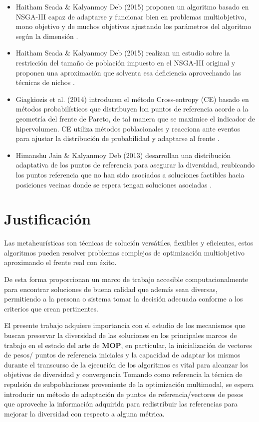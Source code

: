 \documentclass[letterpaper,10pt]{article}
\begin{document}
\begin{itemize}
 \item Haitham Seada \& Kalyanmoy Deb (2015) proponen un algoritmo basado en NSGA-III capaz de adaptarse y funcionar bien en problemas multiobjetivo, mono objetivo y de muchos objetivos ajustando los parámetros del algoritmo según la dimensión \cite{a0ecee762d9f4867a9ded8de598c732e}.
 \item Haitham Seada \& Kalyanmoy Deb (2015) realizan un estudio sobre la restricción del tamaño de población impuesto en el NSGA-III original y proponen una aproximación que solventa esa deficiencia aprovechando las técnicas de nichos \cite{7257251}.
 \item Giagkiozis et al. (2014) introducen el método Cross-entropy (CE) basado en métodos probabilísticos que distribuyen lon puntos de referencia acorde a la geometría del frente de Pareto, de tal manera que se maximice el indicador de hipervolumen. CE utiliza métodos poblacionales y reacciona ante eventos para ajustar la distribución de probabilidad y adaptarse al frente \cite{Giagkiozis2014363}.
 \item Himanshu Jain \& Kalyanmoy Deb (2013) desarrollan una distribución adaptativa de los puntos de referencia para asegurar la diversidad, reubicando los puntos referencia que no han sido asociados a soluciones factibles hacia posiciones vecinas donde se espera tengan soluciones asociadas \cite{jain2013improved}.
\end{itemize}

\section{Justificación}

Las metaheurísticas son técnicas de solución versátiles, flexibles y eficientes, estos algoritmos pueden resolver problemas complejos de optimización multiobjetivo \cite{coello1999comprehensive} aproximando el frente real con éxito.
\newline

De esta forma proporcionan un marco de trabajo accesible computacionalmente para encontrar soluciones de buena calidad que además sean diversas, permitiendo a la persona o sistema tomar la decisión adecuada conforme a los criterios que crean pertinentes.
\newline

El presente trabajo adquiere importancia con el estudio de los mecanismos que buscan preservar la diversidad de las soluciones en los principales marcos de trabajo en el estado del arte de \textbf{MOP}, en particular,
la inicialización de vectores de pesos/ puntos de referencia iniciales y la capacidad de adaptar los mismos durante el transcurso de la ejecución de los algoritmos es vital para alcanzar los objetivos de diversidad y convergencia
Tomando como referencia la técnica de repulsión de subpoblaciones proveniente de la optimización multimodal\cite{doi:10.1162/EVCOa00182}, se espera introducir un método de adaptación de puntos de referencia/vectores de pesos que aproveche la información adquirida para redistribuir las referencias para mejorar la diversidad con respecto a alguna métrica.
\end{document}
